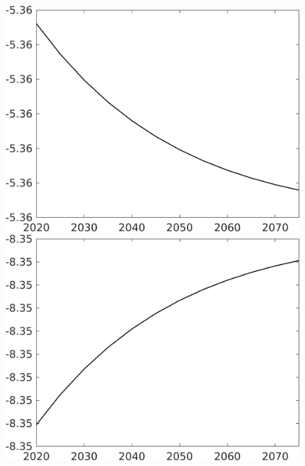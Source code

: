 \documentclass[12pt]{article}
\begin{document}
\begin{figure}[h!!]
\begin{minipage}[]{0.32\textwidth}
	\end{minipage}	
	\begin{minipage}[]{0.32\textwidth}
		\includegraphics[width=1\textwidth]{../../codding_model/own_basedOnFried/optimalPol_010922_revision/figures/all_13Sept22/CompTaul_LFBAUPer_Reg0_hl_spillover0_nsk0_xgr1_knspil1_sep1_countec0_GovRev0_etaa0.79.png}
	\end{minipage}	
	\begin{minipage}[]{0.32\textwidth}
		\includegraphics[width=1\textwidth]{../../codding_model/own_basedOnFried/optimalPol_010922_revision/figures/all_13Sept22/CompTaul_LFBAUPer_Reg0_C_spillover0_nsk0_xgr1_knspil1_sep1_countec0_GovRev0_etaa0.79.png}

\end{minipage}
\end{figure}
\end{document}

